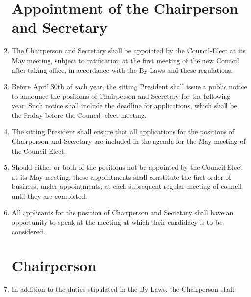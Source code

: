 \documentclass[oneside]{book}
\begin{document}
\begin{enumerate}
\section{\label{Appointment_of_the_Chairperson_and_Secretary}Appointment
of the Chairperson and Secretary }
\item The Chairperson and Secretary shall be appointed by the Council-Elect
at its May meeting, subject to ratification at the first meeting of
the new Council after taking office, in accordance with the By-Laws
and these regulations. 
\item Before April 30th of each year, the sitting President shall issue
a public notice to announce the positions of Chairperson and Secretary
for the following year. Such notice shall include the deadline for
applications, which shall be the Friday before the Council- elect
meeting. 
\item The sitting President shall ensure that all applications for the positions
of Chairperson and Secretary are included in the agenda for the May meeting of
the Council-Elect. 
\item Should either or both of the positions not be appointed by the Council-Elect 
at its May meeting, these appointments shall constitute the first order of  business, 
under appointments, at each subsequent regular meeting of council until they are completed.
\item All applicants for the position of Chairperson and Secretary shall
have an opportunity to speak at the meeting at which their candidacy is to be considered. 

\section{\label{Chairperson}Chairperson }
\item In addition to the duties stipulated in the By-Laws, the Chairperson
shall: 


\end{enumerate}
\end{document}
